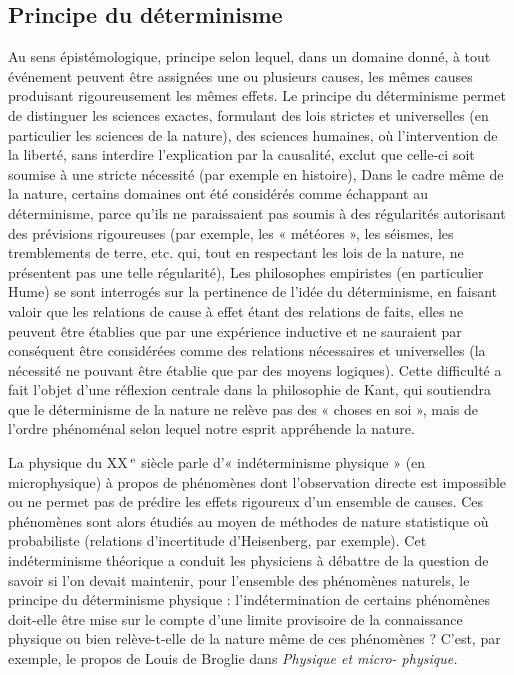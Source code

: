 \subsection{Principe du déterminisme}

Au sens épistémologique, principe selon
lequel, dans un domaine donné, à tout
événement peuvent être assignées une ou
plusieurs causes, les mêmes causes produisant rigoureusement les mêmes effets.
Le principe du déterminisme permet de
distinguer les sciences exactes, formulant
des lois strictes et universelles (en particulier les sciences de la nature), des sciences
humaines, où l'intervention de la liberté,
sans interdire l'explication par la causalité,
exclut que celle-ci soit soumise à une
stricte nécessité (par exemple en histoire), Dans le cadre même de la nature,
certains domaines ont été considérés
comme échappant au déterminisme, parce
qu'ils ne paraissaient pas soumis à des
régularités autorisant des prévisions rigoureuses (par exemple, les « météores », les
séismes, les tremblements de terre, etc.
qui, tout en respectant les lois de la nature,
ne présentent pas une telle régularité), Les
philosophes empiristes (en particulier
Hume) se sont interrogés sur la pertinence
de l’idée du déterminisme, en faisant valoir
que les relations de cause à effet étant des
relations de faits, elles ne peuvent être établies que par une expérience inductive et
ne sauraient par conséquent être considérées comme des relations nécessaires et
universelles (la nécessité ne pouvant être
établie que par des moyens logiques).
Cette difficulté a fait l’objet d’une réflexion
centrale dans la philosophie de Kant, qui
soutiendra que le déterminisme de la
nature ne relève pas des « choses en soi »,
mais de l’ordre phénoménal selon lequel
notre esprit appréhende la nature.

La physique du {\footnotesize XX}$^\text{\,e}$ siècle parle
d'« indéterminisme physique » (en microphysique) à propos de phénomènes dont
l'observation directe est impossible ou ne
permet pas de prédire les effets rigoureux
d'un ensemble de causes. Ces phénomènes sont alors étudiés au moyen de
méthodes de nature statistique où probabiliste (relations d'incertitude d’Heisenberg, par exemple). Cet indéterminisme
théorique a conduit les physiciens à
débattre de la question de savoir si l'on
devait maintenir, pour l'ensemble des phénomènes naturels, le principe du déterminisme physique : l'indétermination de certains phénomènes doit-elle être mise sur le
compte d'une limite provisoire de la
connaissance physique ou bien relève-t-elle de la nature même de ces phénomènes ? C'est, par exemple, le propos de
Louis de Broglie dans {\it Physique et micro-
physique.}

